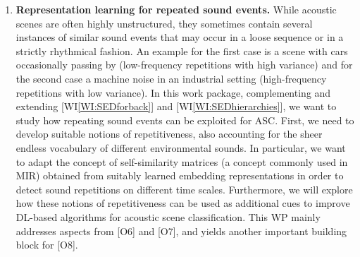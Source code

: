 \documentclass[11pt,a4paper]{article}
\newcommand{\egc}{e.g.,\ }
\newcommand{\jakob}[1]{{\color{magenta} #1}}
\theoremstyle{plain} \newtheorem{define}{Definition}[section]
\begin{document}
{\begin{enumerate}[itemindent=0.5cm]
\item  \label{WI:rep}
\textbf{Representation learning for repeated sound events.}
%
While acoustic scenes are often highly unstructured, they sometimes contain several instances of similar sound events that may occur in a loose sequence or in a strictly rhythmical fashion. An example for the first case is a scene with cars occasionally passing by (low-frequency repetitions with high variance) and for the second case a machine noise in an industrial setting (high-frequency repetitions with low variance).
%
In this work package, complementing and extending [WI\ref{WI:SEDforback}] and [WI\ref{WI:SEDhierarchies}], we want to study how repeating sound events can be exploited for ASC.
%
First, we need to develop suitable notions of repetitiveness, also accounting for the sheer endless vocabulary of different environmental sounds. In particular, we want to adapt the concept of self-similarity matrices (a concept commonly used in MIR) obtained from suitably learned embedding representations in order to detect sound repetitions on different time scales. Furthermore, we will explore how these notions of repetitiveness can be used as additional cues to improve DL-based algorithms for acoustic scene classification. 
%
This WP mainly addresses aspects from [O6] and [O7], and yields another important building block for [O8].
%


\end{enumerate}}
\end{document}
